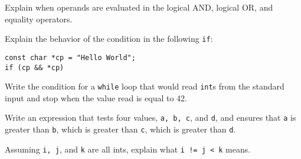 %
%
\begin{question}
Explain when operands are evaluated in the logical AND, logical
OR, and equality operators.
\end{question}

\begin{question}
Explain the behavior of the condition in the following \verb|if|:
\begin{lstlisting}
const char *cp = "Hello World";
if (cp && *cp)
\end{lstlisting}
\end{question}

\begin{question}
Write the condition for a \verb|while| loop that would read \verb|int|s
from the standard input and stop when the value read is equal to 42.
\end{question}

\begin{question}
Write an expression that tests four values, \verb|a, b, c|, and \verb|d|,
and ensures that \verb|a| is greater than \verb|b|, which is greater than \verb|c|, which is
greater than \verb|d|.
\end{question}

\begin{question}
Assuming \verb|i, j|, and \verb|k| are all ints, explain what \verb|i != j < k| means.
\end{question}
